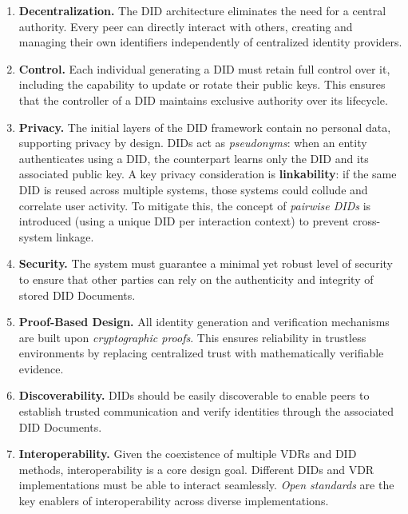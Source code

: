 \begin{enumerate}
    \item \textbf{Decentralization.}  
    The DID architecture eliminates the need for a central authority. Every peer can directly interact with others, creating and managing their own identifiers independently of centralized identity providers.

    \item \textbf{Control.}  
    Each individual generating a DID must retain full control over it, including the capability to update or rotate their public keys. This ensures that the controller of a DID maintains exclusive authority over its lifecycle.

    \item \textbf{Privacy.}  
    The initial layers of the DID framework contain no personal data, supporting privacy by design. DIDs act as \textit{pseudonyms}: when an entity authenticates using a DID, the counterpart learns only the DID and its associated public key.  
    A key privacy consideration is \textbf{linkability}: if the same DID is reused across multiple systems, those systems could collude and correlate user activity. To mitigate this, the concept of \textit{pairwise DIDs} is introduced (using a unique DID per interaction context) to prevent cross-system linkage.

    \item \textbf{Security.}  
    The system must guarantee a minimal yet robust level of security to ensure that other parties can rely on the authenticity and integrity of stored DID Documents.

    \item \textbf{Proof-Based Design.}  
    All identity generation and verification mechanisms are built upon \textit{cryptographic proofs}. This ensures reliability in trustless environments by replacing centralized trust with mathematically verifiable evidence.

    \item \textbf{Discoverability.}  
    DIDs should be easily discoverable to enable peers to establish trusted communication and verify identities through the associated DID Documents.

    \item \textbf{Interoperability.}  
    Given the coexistence of multiple VDRs and DID methods, interoperability is a core design goal. Different DIDs and VDR implementations must be able to interact seamlessly.  
    \textit{Open standards} are the key enablers of interoperability across diverse implementations.


\end{enumerate}

